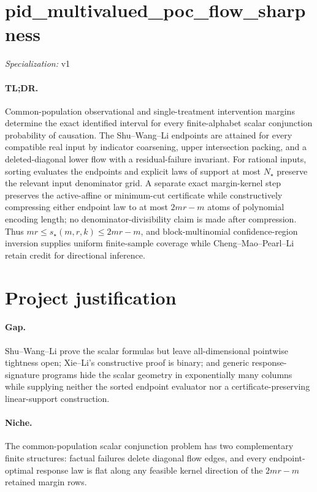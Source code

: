 \documentclass{article}
\begin{document}
\sloppy

\section*{pid\_\allowbreak{}multivalued\_\allowbreak{}poc\_\allowbreak{}flow\_\allowbreak{}sharpness}

\noindent\textit{Specialization:} v1\par

\paragraph{TL;DR.} Common-population observational and single-treatment intervention margins determine the exact identified interval for every finite-alphabet scalar conjunction probability of causation.  The Shu--Wang--Li endpoints are attained for every compatible real input by indicator coarsening, upper intersection packing, and a deleted-diagonal lower flow with a residual-failure invariant.  For rational inputs, sorting evaluates the endpoints and explicit laws of support at most \(N_\star\) preserve the relevant input denominator grid.  A separate exact margin-kernel step preserves the active-affine or minimum-cut certificate while constructively compressing either endpoint law to at most \(2mr-m\) atoms of polynomial encoding length; no denominator-divisibility claim is made after compression.  Thus \(mr\leq s_\star(m,r,k)\leq2mr-m\), and block-multinomial confidence-region inversion supplies uniform finite-sample coverage while Cheng--Mao--Pearl--Li retain credit for directional inference.

\section{Project justification}

\paragraph{Gap.} Shu--Wang--Li prove the scalar formulas but leave all-dimensional pointwise tightness open; Xie--Li's constructive proof is binary; and generic response-signature programs hide the scalar geometry in exponentially many columns while supplying neither the sorted endpoint evaluator nor a certificate-preserving linear-support construction.

\paragraph{Niche.} The common-population scalar conjunction problem has two complementary finite structures: factual failures delete diagonal flow edges, and every endpoint-optimal response law is flat along any feasible kernel direction of the \(2mr-m\) retained margin rows.
\end{document}
